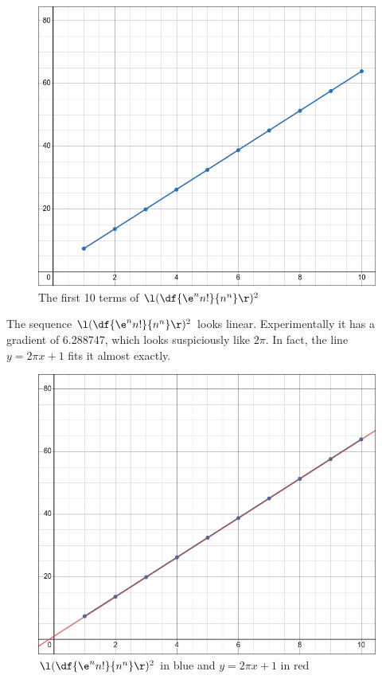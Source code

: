 \documentclass[a4paper]{article}
\begin{document}
\begin{figure}[hbtp]
	\centering
	\includegraphics[scale=0.4]{Q4b}
	\caption{The first 10 terms of $\l(\df{\e^n n!}{n^n}\r)^2$}
\end{figure}

The sequence $\l(\df{\e^n n!}{n^n}\r)^2$ looks linear. Experimentally it has a gradient of 6.288747, which looks suspiciously like $2\pi$. In fact, the line $y = 2\pi x + 1$ fits it almost exactly.

\begin{figure}[hbtp]
	\centering
	\includegraphics[scale=0.4]{Q4c}
	\caption{$\l(\df{\e^n n!}{n^n}\r)^2$ in blue and $y = 2\pi x + 1$ in red}
\end{figure}
\end{document}
